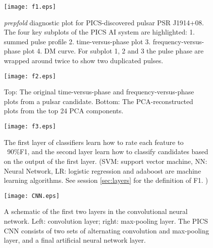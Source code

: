 \documentclass[12pt,preprint]{aastex}
\begin{document}


\begin{figure}
\texttt{[image: f1.eps]} \\ 
\caption {\label{fig:presto} 
{\it prepfold} diagnostic plot for PICS-discovered pulsar PSR
J1914+08. The four key subplots of the PICS AI system are highlighted: 1. summed pulse profile 2. time-versus-phase plot 3. frequency-versus-phase plot 4. DM curve. For subplot 1, 2 and 3
the pulse phase are wrapped around twice to show two duplicated pulses.
}
\end{figure} 

\begin{figure}
\texttt{[image: f2.eps]} \\ 
\caption {\label{fig:pca} 
Top: The original time-versus-phase and frequency-versus-phase plots from a pulsar
candidate.
Bottom: The PCA-reconstructed plots from the top 24 PCA components.
}
\end{figure} 


\begin{figure}
\texttt{[image: f3.eps]} \\ 
\caption {\label{fig:layers} 
The first layer of classifiers learn how to rate each
feature to ~90\%F1, and the second layer learn how to classify candidates based on the
output of the first layer.
(SVM: support vector machine, NN: Neural Network, LR: logistic regression and
adaboost are machine learning algorithms.
See session \ref{sec:layers} for the definition of F1.
)
}
\end{figure} 

\begin{figure}
\texttt{[image: CNN.eps]} \\ 
\caption {\label{fig:cnn} 
A schematic of the first two layers in the convolutional neural
network. Left: convolution layer; right: max-pooling layer.
The PICS CNN consists of two sets of alternating convolution and max-pooling
layer, and a final artificial neural network layer.
}
\end{figure} 


\end{document}
